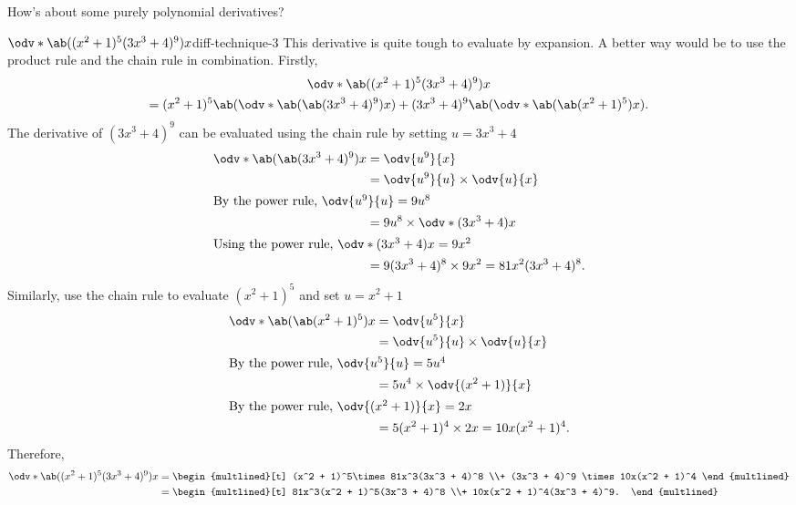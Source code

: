How's about some purely polynomial derivatives?
\begin{exmp}{$\odv*{\ab((x^2 + 1)^5(3x^3 + 4)^9)}{x}$}{diff-technique-3}
	This derivative is quite tough to evaluate by expansion. A better way would be to use the product rule and the chain rule in combination. Firstly,
	\begin{multline}
		\odv*{\ab((x^2 + 1)^5(3x^3 + 4)^9)}{x} \\
		= (x^2 + 1)^5\ab(\odv*{\ab(\ab(3x^3 + 4)^9)}{x}) + (3x^3 + 4)^9\ab(\odv*{\ab(\ab(x^2 + 1)^5)}{x}).
	\end{multline}
	The derivative of $(3x^3 + 4)^9$ can be evaluated using the chain rule by setting $u = 3x^3 + 4$
	\begin{align}
		\odv*{\ab(\ab(3x^3 + 4)^9)}{x} & = \odv{u^9}{x}                                    \\
		                               & = \odv{u^9}{u} \times \odv{u}{x}                  \\
		\intertext{By the power rule, $\odv{u^9}{u} = 9u^8$}
		                               & = 9u^8 \times \odv*{(3x^3 + 4)}{x}                \\
		\intertext{Using the power rule, $\odv*{(3x^3 + 4)}{x} = 9x^2$}
		                               & = 9(3x^3 + 4)^8 \times 9x^2 = 81x^2(3x^3 + 4)^8.
	\end{align}
	Similarly, use the chain rule to evaluate $(x^2 + 1)^5$ and set $u = x^2 + 1$
	\begin{align}
		\odv*{\ab(\ab(x^2 + 1)^5)}{x} & = \odv{u^5}{x}                              \\
		                              & = \odv{u^5}{u} \times \odv{u}{x}            \\
		\intertext{By the power rule, $\odv{u^5}{u} = 5u^4$}
		                              & = 5u^4 \times \odv{(x^2 + 1)}{x}            \\
		\intertext{By the power rule, $\odv{(x^2 + 1)}{x} = 2x$}
		                              & = 5(x^2 + 1)^4 \times 2x = 10x(x^2 + 1)^4.
	\end{align}
	Therefore,
	\begin{align}
		\odv*{\ab((x^2 + 1)^5(3x^3 + 4)^9)}{x} & =
		\begin{multlined}[t]
			(x^2 + 1)^5\times 81x^3(3x^3 + 4)^8 \\+ (3x^3 + 4)^9 \times 10x(x^2 + 1)^4
		\end{multlined} \\
		                                       & = 
		\begin{multlined}[t]
			81x^3(x^2 + 1)^5(3x^3 + 4)^8 \\+ 10x(x^2 + 1)^4(3x^3 + 4)^9.
		\end{multlined}
	\end{align}
\end{exmp}

